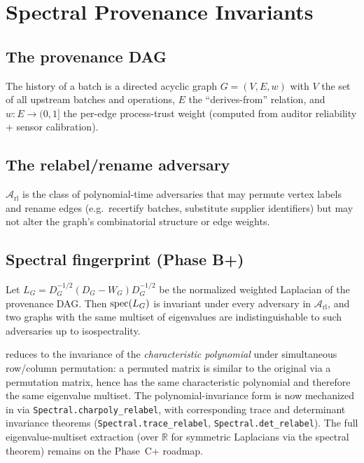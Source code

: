 \section{Spectral Provenance Invariants}
\label{sec:spectral}

\subsection{The provenance DAG}

The history of a batch is a directed acyclic graph $G = (V, E, w)$ with
$V$ the set of all upstream batches and operations, $E$ the
``derives-from'' relation, and $w \colon E \to (0,1]$ the per-edge
process-trust weight (computed from auditor reliability + sensor
calibration).

\subsection{The relabel/rename adversary}

\begin{definition}
\label{def:adversary}
$\mathcal{A}_{\mathrm{rl}}$ is the class of polynomial-time adversaries
that may permute vertex labels and rename edges (e.g.\ recertify
batches, substitute supplier identifiers) but may not alter the graph's
combinatorial structure or edge weights.
\end{definition}

\subsection{Spectral fingerprint (Phase B+)}

\begin{theorem}
\label{thm:spectral}
Let $L_G = D_G^{-1/2}(D_G - W_G) D_G^{-1/2}$ be the normalized
weighted Laplacian \cite{chung} of the provenance DAG. Then
$\operatorname{spec}(L_G)$ is invariant under every adversary in
$\mathcal{A}_{\mathrm{rl}}$, and two graphs with the same multiset of
eigenvalues are indistinguishable to such adversaries up to
isospectrality.
\end{theorem}

 reduces to the invariance of the
\emph{characteristic polynomial} under simultaneous row/column
permutation: a permuted matrix is similar to the original via a
permutation matrix, hence has the same characteristic polynomial and
therefore the same eigenvalue multiset. The polynomial-invariance
form is now mechanized in
 via
\texttt{Spectral.charpoly\_relabel}, with corresponding
trace and determinant invariance theorems
(\texttt{Spectral.trace\_relabel}, \texttt{Spectral.det\_relabel}).
The full eigenvalue-multiset extraction (over $\mathbb{R}$ for
symmetric Laplacians via the spectral theorem) remains on the Phase~C+
roadmap.

